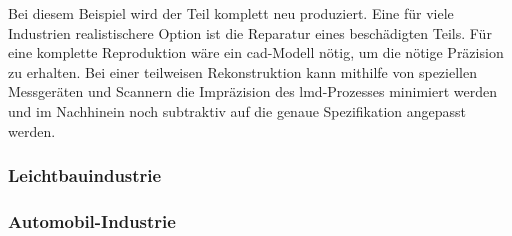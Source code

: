 \documentclass[../main.tex]{subfiles}
\begin{document}
Bei diesem Beispiel wird der Teil komplett neu produziert. 
Eine für viele Industrien realistischere Option ist die Reparatur eines beschädigten Teils. Für eine komplette Reproduktion wäre ein \acrshort{cad}-Modell nötig, um die nötige Präzision zu erhalten. 
Bei einer teilweisen Rekonstruktion kann mithilfe von speziellen Messgeräten und Scannern die Impräzision des \acrshort{lmd}-Prozesses minimiert werden und im Nachhinein noch subtraktiv auf die genaue Spezifikation angepasst werden.
\subsubsection{Leichtbauindustrie}

\subsubsection{Automobil-Industrie}
\end{document}
